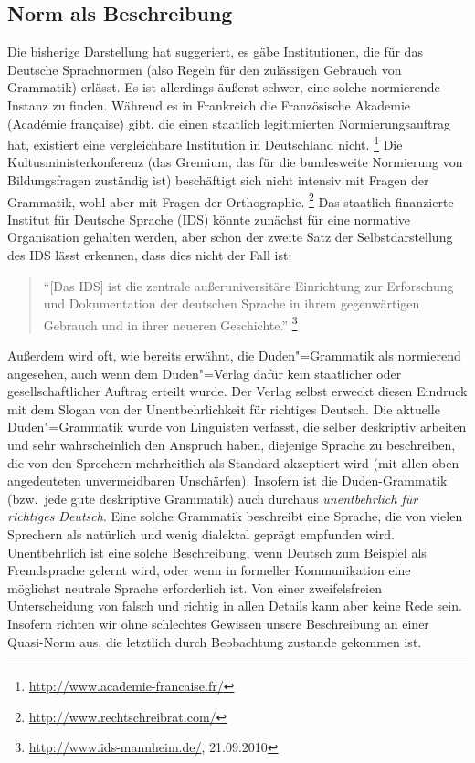 \subsection{Norm als Beschreibung}

\label{sec:normalsbeschreibung}

Die bisherige Darstellung hat suggeriert, es gäbe Institutionen, die für das Deutsche Sprachnormen (also Regeln für den zulässigen Gebrauch von Grammatik) erlässt.
Es ist allerdings äußerst schwer, eine solche normierende Instanz zu finden.
Während es \zB in Frankreich die Französische Akademie (Académie française) gibt, die einen staatlich legitimierten Normierungsauftrag hat, existiert eine vergleichbare Institution in Deutschland nicht.%
\footnote{\raggedright{\url{http://www.academie-francaise.fr/}}}
Die Kultusministerkonferenz (das Gremium, das für die bundesweite Normierung von Bildungsfragen zuständig ist) beschäftigt sich nicht intensiv mit Fragen der Grammatik, wohl aber mit Fragen der Orthographie.%
\footnote{\url{http://www.rechtschreibrat.com/}}
Das staatlich finanzierte Institut für Deutsche Sprache (IDS) könnte zunächst für eine normative Organisation gehalten werden, aber schon der zweite Satz der Selbstdarstellung des IDS lässt erkennen, dass dies nicht der Fall ist:

\begin{quote}
  "`[Das IDS] ist die zentrale außeruniversitäre Einrichtung zur Erforschung und Dokumentation der deutschen Sprache in ihrem gegenwärtigen Gebrauch und in ihrer neueren Geschichte."'%
    \footnote{\raggedright{\url{http://www.ids-mannheim.de/}, 21.09.2010}}
\end{quote}

Außerdem wird oft, wie bereits erwähnt, die Duden"=Grammatik als normierend angesehen, auch wenn dem Duden"=Verlag dafür kein staatlicher oder gesellschaftlicher Auftrag erteilt wurde.
Der Verlag selbst erweckt diesen Eindruck mit dem Slogan von der Unentbehrlichkeit für richtiges Deutsch.
Die aktuelle Duden"=Grammatik wurde von Linguisten verfasst, die selber deskriptiv arbeiten und sehr wahrscheinlich den Anspruch haben, diejenige Sprache zu beschreiben, die von den Sprechern mehrheitlich als Standard akzeptiert wird (mit allen oben angedeuteten unvermeidbaren Unschärfen).
Insofern ist die Duden-Grammatik (bzw.\ jede gute deskriptive Grammatik) auch durchaus \textit{unentbehrlich für richtiges Deutsch}.
Eine solche Grammatik beschreibt eine Sprache, die von vielen Sprechern als natürlich und wenig dialektal geprägt empfunden wird.
Unentbehrlich ist eine solche Beschreibung, wenn Deutsch zum Beispiel als Fremdsprache gelernt wird, oder wenn in formeller Kommunikation eine möglichst neutrale Sprache erforderlich ist.
Von einer zweifelsfreien Unterscheidung von falsch und richtig in allen Details kann aber keine Rede sein.
Insofern richten wir ohne schlechtes Gewissen unsere Beschreibung an einer Quasi-Norm aus, die letztlich durch Beobachtung zustande gekommen ist.

